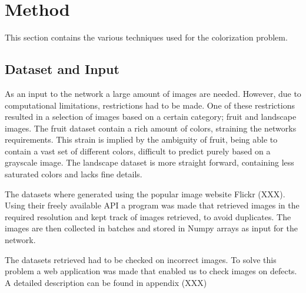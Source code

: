 \section{Method} \label{sec:method}
%
%
%
%

This section contains the various techniques used for the colorization problem.
\subsection{Dataset and Input}

As an input to the network a large amount of images are needed.
However, due to computational limitations, restrictions had to be made.
One of these restrictions resulted in a selection of images based on a certain category; fruit and landscape images.
The fruit dataset contain a rich amount of colors, straining the networks requirements.
This strain is implied by the ambiguity of fruit, being able to contain a vast set of different colors, difficult to predict purely based on a grayscale image.
The landscape dataset is more straight forward, containing less saturated colors and lacks fine details.

The datasets where generated using the popular image website {\color{red} Flickr (XXX)}.
Using their freely available API a program was made that retrieved images in the required resolution and kept track of images retrieved, to avoid duplicates.
The images are then collected in batches and stored in Numpy arrays as input for the network.

The datasets retrieved had to be checked on incorrect images. To solve this problem a web application was made that enabled us to check images on defects. A detailed description can be found in {\color{red}appendix (XXX)}

